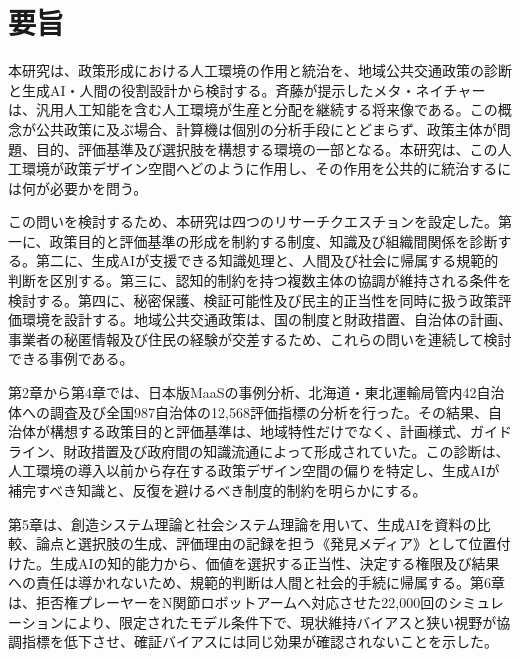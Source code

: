 
\chapter*{要旨}

本研究は、政策形成における人工環境の作用と統治を、地域公共交通政策の診断と生成AI・人間の役割設計から検討する。斉藤が提示したメタ・ネイチャーは、汎用人工知能を含む人工環境が生産と分配を継続する将来像である。この概念が公共政策に及ぶ場合、計算機は個別の分析手段にとどまらず、政策主体が問題、目的、評価基準及び選択肢を構想する環境の一部となる。本研究は、この人工環境が政策デザイン空間へどのように作用し、その作用を公共的に統治するには何が必要かを問う。

この問いを検討するため、本研究は四つのリサーチクエスチョンを設定した。第一に、政策目的と評価基準の形成を制約する制度、知識及び組織間関係を診断する。第二に、生成AIが支援できる知識処理と、人間及び社会に帰属する規範的判断を区別する。第三に、認知的制約を持つ複数主体の協調が維持される条件を検討する。第四に、秘密保護、検証可能性及び民主的正当性を同時に扱う政策評価環境を設計する。地域公共交通政策は、国の制度と財政措置、自治体の計画、事業者の秘匿情報及び住民の経験が交差するため、これらの問いを連続して検討できる事例である。

第2章から第4章では、日本版MaaSの事例分析、北海道・東北運輸局管内42自治体への調査及び全国987自治体の12,568評価指標の分析を行った。その結果、自治体が構想する政策目的と評価基準は、地域特性だけでなく、計画様式、ガイドライン、財政措置及び政府間の知識流通によって形成されていた。この診断は、人工環境の導入以前から存在する政策デザイン空間の偏りを特定し、生成AIが補完すべき知識と、反復を避けるべき制度的制約を明らかにする。

第5章は、創造システム理論と社会システム理論を用いて、生成AIを資料の比較、論点と選択肢の生成、評価理由の記録を担う《発見メディア》として位置付けた。生成AIの知的能力から、価値を選択する正当性、決定する権限及び結果への責任は導かれないため、規範的判断は人間と社会的手続に帰属する。第6章は、拒否権プレーヤーをN関節ロボットアームへ対応させた22,000回のシミュレーションにより、限定されたモデル条件下で、現状維持バイアスと狭い視野が協調指標を低下させ、確証バイアスには同じ効果が確認されないことを示した。

